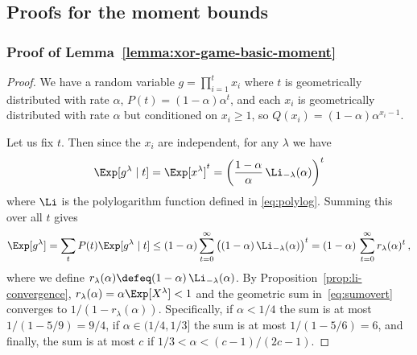 \subsection{Proofs for the moment bounds}
\subsubsection*{Proof of Lemma~\ref{lemma:xor-game-basic-moment}}
\begin{proof}
We have a random variable $g = \prod_{i=1}^t x_i$ where $t$ is geometrically distributed with rate $\alpha$, $P(t) = (1-\alpha)\alpha^t$, and each $x_i$ is geometrically distributed with rate $\alpha$ but conditioned on $x_i \ge 1$, so $Q(x_i) = (1-\alpha) \alpha^{x_i-1}$.

Let us fix $t$. Then since the $x_i$ are independent, for any $\lambda$ we have
\[
    \Exp[g^\lambda \mid t] 
    = \Exp[x^\lambda]^t 
    = \left( \frac{1-\alpha}{\alpha} \,\Li_{-\lambda}(\alpha) \right)^t
\]
where $\Li$ is the polylogarithm function defined in \eqref{eq:polylog}.
Summing this over all $t$ gives
\begin{equation}
\label{eq:sumovert}
\Exp[g^\lambda] = \sum_{t} P(t) \Exp[g^\lambda \mid t] 
\le (1-\alpha) \sum_{t=0}^\infty \big( (1-\alpha) \,\Li_{-\lambda}(\alpha) \big)^{t} 
= (1-\alpha)\,\sum_{t=0}^\infty r_\lambda(\alpha)^{t} 
\, ,
\end{equation}
where we define $r_\lambda(\alpha) \defeq (1-\alpha) \,\Li_{-\lambda}(\alpha)$.
By Proposition~\ref{prop:li-convergence}, $r_\lambda(\alpha) = \alpha \Exp[X^\lambda] < 1$ 
and the geometric sum in~\eqref{eq:sumovert} converges to $1/(1-r_\lambda(\alpha) )$. 
Specifically, if $\alpha < 1/4$ the sum is at most $1/(1-5/9) = 9/4$, 
if $\alpha \in (1/4, 1/3]$ the sum is at most $1/(1-5/6) = 6$, and finally, 
the sum is at most $c$ if $1/3 < \alpha < (c-1)/(2c-1)$.



\end{proof}

